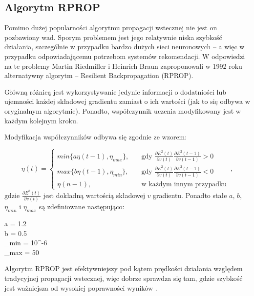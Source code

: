 \documentclass[twoside]{iisthesis}
\begin{document}
 		 \subsection{Algorytm RPROP}		 
		 
		 Pomimo dużej popularności algorytmu propagacji wstecznej nie jest on pozbawiony wad. Sporym problemem jest jego relatywnie niska szybkość działania, szczególnie w przypadku bardzo dużych sieci neuronowych -- a więc w przypadku odpowiadającemu potrzebom systemów rekomendacji. W odpowiedzi na te problemy Martin Riedmiller i Heinrich Braun zaproponowali w 1992 roku alternatywny algorytm -- Resilient Backpropagation (RPROP).
		 
		 Główną różnicą jest wykorzystywanie jedynie informacji o dodatniości lub ujemności każdej składowej gradientu zamiast o ich wartości (jak to się odbywa w oryginalnym algorytmie). Ponadto, współczynnik uczenia modyfikowany jest w każdym kolejnym kroku. 
		 
		 Modyfikacja współczynników odbywa się zgodnie ze wzorem:
		 
		 \begin{equation}
		 \label{eq:rprop}		 
		 \eta(t) = 
		 \begin{cases}
			min\{a \eta(t-1), \eta_{max}\}, & \quad \text{gdy } \frac{\partial E^2(t)}{\partial v(t)} \frac{\partial E^2(t-1)}{\partial v(t-1)} > 0 \\
			max\{b \eta(t-1), \eta_{min}\}, & \quad \text{gdy } \frac{\partial E^2(t)}{\partial v(t)} \frac{\partial E^2(t-1)}{\partial v(t-1)} < 0 \\
			\eta(n-1), & \quad \text{w każdym innym przypadku} 
		 \end{cases}		 
		 \,,
		 \end{equation}		 
		 gdzie $\frac{\partial E^2(t)}{\partial v(t)}$ jest dokładną wartością składowej $v$ gradientu. Ponadto stałe $a$, $b$, $\eta_{min}$ i $\eta_{max}$ są zdefiniowane następująco:

		 \begin{conditions*}
		 	a = 1.2 \\
		 	b = 0.5 \\
		 	\eta_{min} = 10^{-6} \\
		 	\eta_{max} = 50
		 \end{conditions*} 
		 
		 Algorytm RPROP jest efektywniejszy pod kątem prędkości działania względem tradycyjnej propagacji wstecznej, więc dobrze sprawdza się tam, gdzie szybkość jest ważniejsza od wysokiej poprawności wyników \cite{riedmiller1993direct,riedmiller1994rprop}.
		 		 
\end{document}
